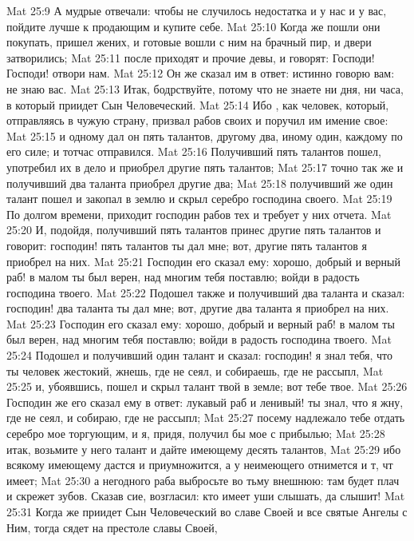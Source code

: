 \vs Mat 25:9 А мудрые отвечали: чтобы не случилось недостатка и у нас и у вас, пойдите лучше к продающим и купите себе.
\vs Mat 25:10 Когда же пошли они покупать, пришел жених, и готовые вошли с ним на брачный пир, и двери затворились;
\vs Mat 25:11 после приходят и прочие девы, и говорят: Господи! Господи! отвори нам.
\vs Mat 25:12 Он же сказал им в ответ: истинно говорю вам: не знаю вас.
\vs Mat 25:13 Итак, бодрствуйте, потому что не знаете ни дня, ни часа, в который приидет Сын Человеческий.
\rsbpar\vs Mat 25:14 Ибо , как человек, который, отправляясь в чужую страну, призвал рабов своих и поручил им имение свое:
\vs Mat 25:15 и одному дал он пять талантов, другому два, иному один, каждому по его силе; и тотчас отправился.
\vs Mat 25:16 Получивший пять талантов пошел, употребил их в дело и приобрел другие пять талантов;
\vs Mat 25:17 точно так же и получивший два таланта приобрел другие два;
\vs Mat 25:18 получивший же один талант пошел и закопал  в землю и скрыл серебро господина своего.
\vs Mat 25:19 По долгом времени, приходит господин рабов тех и требует у них отчета.
\vs Mat 25:20 И, подойдя, получивший пять талантов принес другие пять талантов и говорит: господин! пять талантов ты дал мне; вот, другие пять талантов я приобрел на них.
\vs Mat 25:21 Господин его сказал ему: хорошо, добрый и верный раб! в малом ты был верен, над многим тебя поставлю; войди в радость господина твоего.
\vs Mat 25:22 Подошел также и получивший два таланта и сказал: господин! два таланта ты дал мне; вот, другие два таланта я приобрел на них.
\vs Mat 25:23 Господин его сказал ему: хорошо, добрый и верный раб! в малом ты был верен, над многим тебя поставлю; войди в радость господина твоего.
\vs Mat 25:24 Подошел и получивший один талант и сказал: господин! я знал тебя, что ты человек жестокий, жнешь, где не сеял, и собираешь, где не рассыпл,
\vs Mat 25:25 и, убоявшись, пошел и скрыл талант твой в земле; вот тебе твое.
\vs Mat 25:26 Господин же его сказал ему в ответ: лукавый раб и ленивый! ты знал, что я жну, где не сеял, и собираю, где не рассыпл;
\vs Mat 25:27 посему надлежало тебе отдать серебро мое торгующим, и я, придя, получил бы мое с прибылью;
\vs Mat 25:28 итак, возьмите у него талант и дайте имеющему десять талантов,
\vs Mat 25:29 ибо всякому имеющему дастся и приумножится, а у неимеющего отнимется и т, чт имеет;
\vs Mat 25:30 а негодного раба выбросьте во тьму внешнюю: там будет плач и скрежет зубов. Сказав сие, возгласил: кто имеет уши слышать, да слышит!
\rsbpar\vs Mat 25:31 Когда же приидет Сын Человеческий во славе Своей и все святые Ангелы с Ним, тогда сядет на престоле славы Своей,

